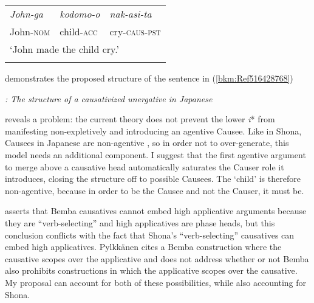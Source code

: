 \documentclass[output=paper,modfonts,nonflat]{langsci/langscibook}
\begin{document}
\tablefirsthead{}

\tabletail{}
\tablelasttail{}
\begin{tabularx}{\textwidth}{XXX}
\lsptoprule
\textit{John-ga} & \textit{kodomo-o} & \textit{nak-asi-ta}\\
John-\textsc{nom} & child-\textsc{acc} & cry-\textsc{caus-pst}\\
\multicolumn{3}{X}{‘John made the child cry.’}\\
\lspbottomrule
\end{tabularx}
\begin{styleDefault}
 demonstrates the proposed structure of the sentence in (\ref{bkm:Ref516428768})
\end{styleDefault}

\begin{styleDefault}
    
 
\end{styleDefault}

\begin{styleDefault}
\textit{: The structure of a causativized unergative in Japanese}
\end{styleDefault}

\begin{styleDefault}
 reveals a problem: the current theory does not prevent the lower \textit{i}* from manifesting non-expletively and introducing an agentive Causee. Like in Shona, Causees in Japanese are non-agentive \citep[107]{Pylkkänen2008}, so in order not to over-generate, this model needs an additional component. I suggest that the first agentive argument to merge above a causative head automatically saturates the Causer role it introduces, closing the structure off to possible Causees. The ‘child’ is therefore non-agentive, because in order to be the Causee and not the Causer, it must be. 
\end{styleDefault}

\begin{styleDefault}
\citet{Pylkkänen2008} asserts that Bemba causatives cannot embed high applicative arguments because they are “verb-selecting” and high applicatives are phase heads, but this conclusion conflicts with the fact that Shona’s “verb-selecting” causatives can embed high applicatives. Pylkkänen cites a Bemba construction where the causative scopes over the applicative and does not address whether or not Bemba also prohibits constructions in which the applicative scopes over the causative. My proposal can account for both of these possibilities, while also accounting for Shona. 
\end{styleDefault}
\end{document}
